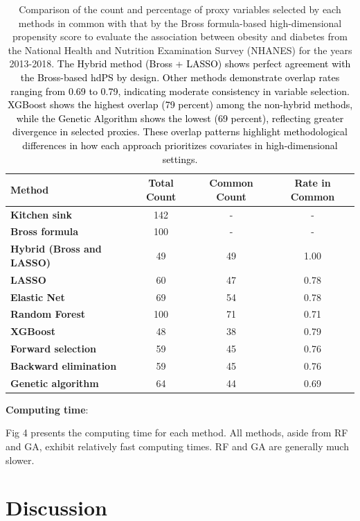 \documentclass[10pt,letterpaper]{article}
\begin{document}
\begin{table}[htbp]
\centering
\caption{Comparison of the count and percentage of proxy variables selected by each methods in common with that by the Bross formula-based high-dimensional propensity score to evaluate the association between obesity and diabetes from the National Health and Nutrition Examination Survey (NHANES) for the years 2013-2018. \textcolor{black}{The Hybrid method (Bross + LASSO) shows perfect agreement with the Bross-based hdPS by design. Other methods demonstrate overlap rates ranging from 0.69 to 0.79, indicating moderate consistency in variable selection. XGBoost shows the highest overlap (79 percent) among the non-hybrid methods, while the Genetic Algorithm shows the lowest (69 percent), reflecting greater divergence in selected proxies. These overlap patterns highlight methodological differences in how each approach prioritizes covariates in high-dimensional settings.}}
\label{tab:proxy-common-pct-bross}
\begin{tabular}{p{4cm}ccc}
\toprule
\textbf{Method} & \textbf{Total Count} & \textbf{Common Count} & \textbf{Rate in Common} \\ 
\midrule
\textbf{Kitchen sink} & 142 & - & - \\
\textbf{Bross formula} & 100 & - & - \\
\textbf{Hybrid (Bross and LASSO)} & 49 & 49 & 1.00 \\
\textbf{LASSO} & 60 & 47 & 0.78 \\
\textbf{Elastic Net} & 69 & 54 & 0.78 \\
\textbf{Random Forest} & 100 & 71 & 0.71 \\  
\textbf{XGBoost} & 48 & 38 & 0.79 \\
\textbf{Forward selection} & 59 & 45 & 0.76 \\
\textbf{Backward elimination} & 59 & 45 & 0.76 \\
\textbf{Genetic algorithm} & 64 & 44 & 0.69 \\
\bottomrule
\end{tabular}
\end{table}

\textbf{Computing time}:

Fig 4 presents the computing time for each
method. All methods, aside from RF and GA, exhibit relatively fast
computing times. RF and GA are generally much slower.



\section{Discussion}\label{discussion}
\end{document}
